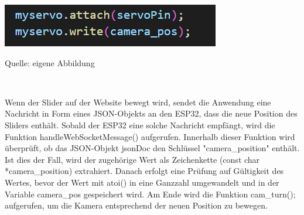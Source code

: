 \documentclass[ngerman,12pt,a4paper]{article}
\begin{document}
				\begin{center}
					\begin{minipage}[t]{0.6\textwidth}
						\includegraphics{Pictures/servofunktionen}
						\label{fig:servofunktionen}
						\vspace{-10pt}
						\begin{center}
							\par\small Quelle: eigene Abbildung 
						\end{center}
					\end{minipage} \\[0.70cm]
				\end{center}
				Wenn der Slider auf der Website bewegt wird, sendet die Anwendung eine Nachricht in Form eines JSON-Objekts an den ESP32, dass die neue Position des Sliders enthält. Sobald der ESP32 eine solche Nachricht empfängt, wird die Funktion handleWebSocketMessage() aufgerufen. Innerhalb dieser Funktion wird überprüft, ob das JSON-Objekt jsonDoc den Schlüssel "camera\_position" enthält. Ist dies der Fall, wird der zugehörige Wert als Zeichenkette (const char *camera\_position) extrahiert. Danach erfolgt eine Prüfung auf Gültigkeit des Wertes, bevor der Wert mit atoi() in eine Ganzzahl umgewandelt und in der Variable camera\_pos gespeichert wird. Am Ende wird die Funktion cam\_turn(); aufgerufen, um die Kamera entsprechend der neuen Position zu bewegen. 
				
\end{document}
